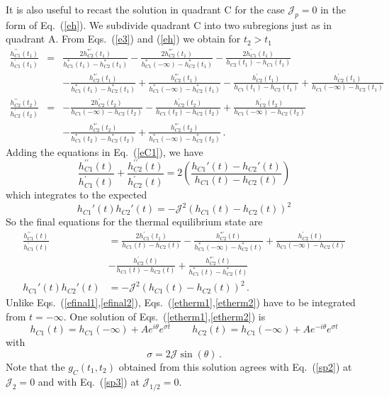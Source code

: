 \documentclass[prx,aps,onecolumn,amsfonts,showpacs,superscriptaddress,preprint,eqsecnum]
{revtex4-1}
\newcommand{\beq}{\begin{equation}}
\newcommand{\eeq}{\end{equation}}
\def\bea{\begin{eqnarray}}
\def\eea{\end{eqnarray}}
\newcommand{\nn}{\nonumber \\}
\begin{document}
It is also useful to recast the solution in quadrant C for the case $\mathcal{J}_p =0$ in the form of Eq.~(\ref{eh}).
We subdivide quadrant C into two subregions just as in quadrant A.
From Eqs.~(\ref{e3}) and (\ref{eh}) we obtain for $t_2 > t_1$ 
\bea
\frac{h_{C1}^{\prime\prime} (t_1)}{h_{C1}^{\prime} (t_1)} &=& 
\frac{2 h_{C2}^{\ast\prime} (t_1)}{h_{C1}^\ast (t_1) - h_{C2}^\ast (t_1)} 
-\frac{2 h_{C2}^{\ast\prime} (t_1)}{h_{C1}^\ast (-\infty) - h_{C2}^\ast (t_1)} - \frac{2 h_{C1}^{\prime} (t_1)}{h_{C2} (t_1) - h_{C1} (t_1)} \nn
 &~& - \frac{h_{C2}^{\ast\prime} (t_1)}{h_{C1}^\ast (t_1) - h_{C2}^\ast (t_1)} + \frac{h_{C2}^{\ast\prime} (t_1)}{h_{C1}^\ast (-\infty) - h_{C2}^\ast (t_1)} - \frac{h_{C2}^{\prime} (t_1)}{h_{C1} (t_1) - h_{C2} (t_1)} + \frac{h_{C2}^{\prime} (t_1)}{h_{C1} (-\infty) - h_{C2} (t_1)} \nn
\frac{h_{C2}^{\prime\prime} (t_2)}{h_{C2}^{\prime} (t_2)} &=& -\frac{2 h_{C2}^{\prime} (t_2)}{h_{C1} (-\infty) - h_{C2} (t_2)} 
-\frac{h_{C2}^{\prime} (t_2)}{h_{C1} (t_2) - h_{C2} (t_2)} + \frac{h_{C2}^{\prime} (t_2)}{h_{C1} (-\infty) - h_{C2} (t_2)} \nn
&~& - \frac{h_{C2}^{\ast\prime} (t_2)}{h_{C1}^\ast (t_2) - h_{C2}^\ast (t_2)} + \frac{h_{C2}^{\ast\prime} (t_2)}{h_{C1}^\ast (-\infty) - h_{C2}^\ast (t_2)} \,. \label{eC1}
\eea
Adding the equations in Eq.~(\ref{eC1}), we have
\beq
\frac{h_{C1}^{\prime\prime} (t)}{h_{C1}^{\prime} (t)} + \frac{h_{C2}^{\prime\prime} (t)}{h_{C2}^{\prime} (t)} = 
2 \left( \frac{h_{C1}' (t)  - h_{C2}' (t)}{h_{C1} (t) - h_{C2} (t)} \right)
\eeq
which integrates to the expected
\beq
h_{C1}' (t) h_{C2}' (t) = -\mathcal{J}^2 (h_{C1} (t) - h_{C2} (t))^2
\eeq
So the final equations for the thermal equilibrium state are
\begin{align}
\frac{h_{C1}^{\prime\prime} (t)}{h_{C1}^{\prime} (t)} &=   \frac{2 h_{C1}^{\prime} (t_1)}{h_{C1} (t) - h_{C2} (t)} 
-\frac{h_{C2}^{\ast\prime} (t)}{h_{C1}^\ast (-\infty) - h_{C2}^\ast (t)} + \frac{h_{C2}^{\prime} (t)}{h_{C1} (-\infty) - h_{C2} (t)} \label{etherm1} \\
& - \frac{h_{C2}^{\prime} (t)}{h_{C1} (t) - h_{C2} (t)} + \frac{ h_{C2}^{\ast\prime} (t)}{h_{C1}^\ast (t) - h_{C2}^\ast (t)} 
\nn
h_{C1}' (t) h_{C2}' (t) &= -\mathcal{J}^2 (h_{C1} (t) - h_{C2} (t))^2 \,. \label{etherm2}
\end{align}
Unlike Eqs.~(\ref{efinal1},\ref{efinal2}), Eqs.~(\ref{etherm1},\ref{etherm2}) have to be integrated from $t=-\infty$.
One solution of Eqs.~(\ref{etherm1},\ref{etherm2}) is
\beq
h_{C1} (t) = h_{C1} (-\infty) + A e^{i \theta} e^{\sigma t} \quad \, \quad  h_{C2} (t) = h_{C1} (-\infty) + A e^{-i \theta} e^{\sigma t} 
\label{Cexact}
\eeq
with
\beq
\sigma = 2 \mathcal{J} \sin (\theta) \,.
\eeq
Note that the $g_C (t_1,t_2)$ obtained from this 
solution agrees with Eq.~(\ref{sp2}) at $\mathcal{J}_2 = 0$ and with 
Eq.~(\ref{sp3}) at $\mathcal{J}_{1/2}=0$.




\end{document}
